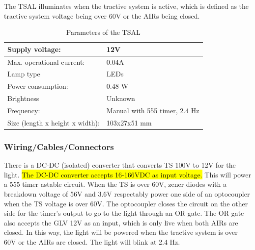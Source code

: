 \documentclass{article}
\DeclareRobustCommand{\hlr}[1]{{\sethlcolor{red}\hl{#1}}}
\begin{document}
            The TSAL illuminates when the tractive system is active, which is defined as the tractive system voltage being over 60V or the AIRs being closed. 

            \begin{table}[H]
                \centering
                \begin{tabular}{|l|l|}
                \hline
                Supply voltage: & 12V \\ \hline
                Max. operational current: &  0.04A\\ \hline
                Lamp type & LEDs \\ \hline
                Power consumption: & 0.48 W\\ \hline
                Brightness & Unknown \\ \hline
                Frequency: & Manual with 555 timer, 2.4 Hz \\ \hline
                Size (length x height x width): & 103x27x51 mm \\ \hline
                \end{tabular}
                \caption{Parameters of the TSAL}
                \label{TSALparameters}
            \end{table}

        \subsubsection{Wiring/Cables/Connectors}

            
            There is a DC-DC (isolated) converter that converts TS 100V to 12V for the light. \hlr{The DC-DC converter accepts 16-166VDC as input voltage.} This will power a 555 timer astable circuit. When the TS is over 60V, zener diodes with a breakdown voltage of 56V and 3.6V respectably power one side of an optocoupler when the TS voltage is over 60V. The optocoupler closes the circuit on the other side for the timer's output to go to the light through an OR gate. The OR gate also accepts the GLV 12V as an input, which is only live when both AIRs are closed. In this way, the light will be powered when the tractive system is over 60V or the AIRs are closed. The light will blink at 2.4 Hz. 
\end{document}
